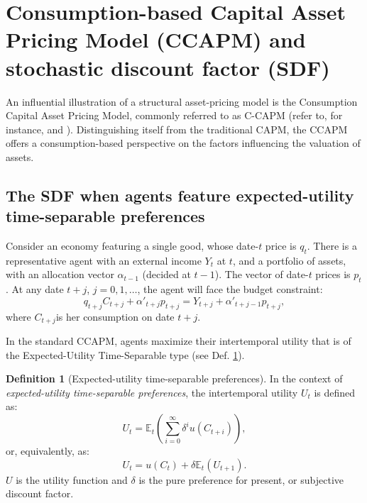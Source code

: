 \documentclass[
  12pt,
]{book}
\theoremstyle{definition}
\newtheorem{definition}{Definition}[chapter]
\theoremstyle{definition}
\theoremstyle{definition}
\theoremstyle{definition}
\theoremstyle{remark}
\begin{document}
\hypertarget{PricingEquilibrium}{%
\section{Consumption-based Capital Asset Pricing Model (CCAPM) and stochastic discount factor (SDF)}\label{PricingEquilibrium}}

An influential illustration of a structural asset-pricing model is the Consumption Capital Asset Pricing Model, commonly referred to as C-CAPM (refer to, for instance, \citet{Merton_1973} and \citet{BREEDEN1979265}). Distinguishing itself from the traditional CAPM, the CCAPM offers a consumption-based perspective on the factors influencing the valuation of assets.

\hypertarget{the-sdf-when-agents-feature-expected-utility-time-separable-preferences}{%
\subsection{The SDF when agents feature expected-utility time-separable preferences}\label{the-sdf-when-agents-feature-expected-utility-time-separable-preferences}}

Consider an economy featuring a single good, whose date-\(t\) price is \(q_t\). There is a representative agent with an external income \(Y_t\) at \(t\), and a portfolio of assets, with an allocation vector \(\alpha_{t-1}\) (decided at \(t-1\)). The vector of date-\(t\) prices is \(p_t\). At any date \(t+j\), \(j=0,1,\dots\), the agent will face the budget constraint:
\begin{equation}
q_{t+j}C_{t+j}+\alpha'_{t+j}p_{t+j} = Y_{t+j} +
\alpha'_{t+j-1}p_{t+j},\label{eq:BConstr}
\end{equation}
where \(C_{t+j}\)is her consumption on date \(t+j\).

In the standard CCAPM, agents maximize their intertemporal utility that is of the Expected-Utility Time-Separable type (see Def. \ref{def:EUTSpref}).

\begin{definition}[Expected-utility time-separable preferences]
\protect\hypertarget{def:EUTSpref}{}\label{def:EUTSpref}In the context of \emph{expected-utility time-separable preferences}, the intertemporal utility \(U_t\) is defined as:
\[
U_t = \mathbb{E}_t\left(\sum_{i=0}^{\infty} \delta^{i}u(C_{t+i})\right),
\]
or, equivalently, as:
\[
U_t = u(C_t) + \delta \mathbb{E}_t\left(U_{t+1}\right).
\]
\(U\) is the utility function and \(\delta\) is the pure preference for present, or subjective discount factor.
\end{definition}
\end{document}
